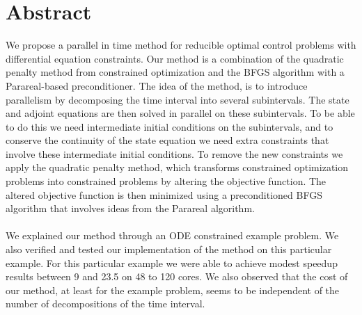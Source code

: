 \chapter*{Abstract}
We propose a parallel in time method for reducible optimal control problems with differential equation constraints. Our method is a combination of the quadratic penalty method from constrained optimization and the BFGS algorithm with a Parareal-based preconditioner. The idea of the method, is to introduce parallelism by decomposing the time interval into several subintervals. The state and adjoint equations are then solved in parallel on these subintervals. To be able to do this we need intermediate initial conditions on the subintervals, and to conserve the continuity of the state equation we need extra constraints that involve these intermediate initial conditions. To remove the new constraints we apply the quadratic penalty method, which transforms constrained optimization problems into constrained problems by altering the objective function. The altered objective function is then minimized using a preconditioned BFGS algorithm that involves ideas from the Parareal algorithm.
\\
\\
We explained our method through an ODE constrained example problem. We also verified and tested our implementation of the method on this particular example. For this particular example we were able to achieve modest speedup results between 9 and 23.5 on 48 to 120 cores. We also observed that the cost of our method, at least for the example problem, seems to be independent of the number of decompositions of the time interval.
